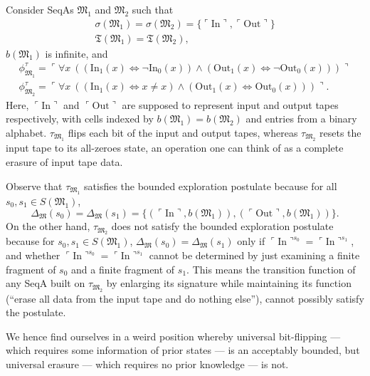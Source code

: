 \documentclass[12pt]{article}
\numberwithin{equation}{section}
\begin{document}
\begin{ex}\label{ex218}
Consider SeqAs $\mathfrak{M}_1$ and $\mathfrak{M}_2$ such that 
\begin{gather*}
    \sigma(\mathfrak{M}_1) = \sigma(\mathfrak{M}_2) = \{\ulcorner \mathrm{In} \urcorner, \ulcorner \mathrm{Out} \urcorner\} \\
    \mathfrak{T}(\mathfrak{M}_1) = \mathfrak{T}(\mathfrak{M}_2) \text{,}
\end{gather*}
$b(\mathfrak{M}_1)$ is infinite, and
\begin{gather*}
    \phi^{\tau}_{\mathfrak{M}_1} = \ulcorner \forall x \ ((\mathrm{In}_1(x) \iff \neg \mathrm{In}_0(x)) \wedge (\mathrm{Out}_1(x) \iff \neg \mathrm{Out}_0(x))) \urcorner \\
    \phi^{\tau}_{\mathfrak{M}_2} = \ulcorner \forall x \ ((\mathrm{In}_1(x) \iff x \neq x) \wedge (\mathrm{Out}_1(x) \iff \mathrm{Out}_0(x))) \urcorner \text{.}
\end{gather*}
Here, $\ulcorner \mathrm{In} \urcorner$ and $\ulcorner \mathrm{Out} \urcorner$ are supposed to represent input and output tapes respectively, with cells indexed by $b(\mathfrak{M}_1) = b(\mathfrak{M}_2)$ and entries from a binary alphabet. $\tau_{\mathfrak{M}_1}$ flips each bit of the input and output tapes, whereas $\tau_{\mathfrak{M}_2}$ resets the input tape to its all-zeroes state, an operation one can think of as a complete erasure of input tape data.

Observe that $\tau_{\mathfrak{M}_1}$ satisfies the bounded exploration postulate because for all $s_0, s_1 \in S(\mathfrak{M}_1)$, 
\begin{equation*}
    \Delta_{\mathfrak{M}}(s_0) = \Delta_{\mathfrak{M}}(s_1) = \{(\ulcorner \mathrm{In} \urcorner, b(\mathfrak{M}_1)), (\ulcorner \mathrm{Out} \urcorner, b(\mathfrak{M}_1))\} \text{.}
\end{equation*}
On the other hand, $\tau_{\mathfrak{M}_2}$ does not satisfy the bounded exploration postulate because for $s_0, s_1 \in S(\mathfrak{M}_1)$, $\Delta_{\mathfrak{M}}(s_0) = \Delta_{\mathfrak{M}}(s_1)$ only if $\ulcorner \mathrm{In} \urcorner^{s_0} = \ulcorner \mathrm{In} \urcorner^{s_1}$, and whether $\ulcorner \mathrm{In} \urcorner^{s_0} = \ulcorner \mathrm{In} \urcorner^{s_1}$ cannot be determined by just examining a finite fragment of $s_0$ and a finite fragment of $s_1$. This means the transition function of any SeqA built on $\tau_{\mathfrak{M}_2}$ by enlarging its signature while maintaining its function (``erase all data from the input tape and do nothing else''), cannot possibly satisfy the postulate.

We hence find ourselves in a weird position whereby universal bit-flipping --- which requires some information of prior states --- is an acceptably bounded, but universal erasure --- which requires no prior knowledge --- is not.
\end{ex}
\end{document}
